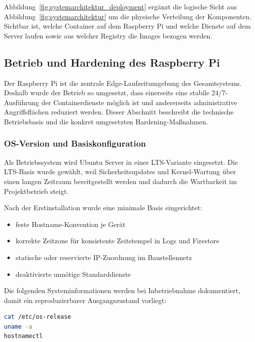 Abbildung~\ref{fig:systemarchitektur_deployment} ergänzt die logische Sicht aus Abbildung~\ref{fig:systemarchitektur} um die physische Verteilung der Komponenten. Sichtbar ist, welche Container auf dem Raspberry Pi und welche Dienste auf dem Server laufen sowie aus welcher Registry die Images bezogen werden.

\subsection{Betrieb und Hardening des Raspberry Pi}

Der Raspberry Pi ist die zentrale Edge-Laufzeitumgebung des Gesamtsystems. Deshalb wurde der Betrieb so umgesetzt, dass einerseits eine stabile 24/7-Ausführung der Containerdienste möglich ist und andererseits administrative Angriffsflächen reduziert werden. Dieser Abschnitt beschreibt die technische Betriebsbasis und die konkret umgesetzten Hardening-Maßnahmen.

\subsubsection{OS-Version und Basiskonfiguration}

Als Betriebssystem wird Ubuntu Server in einer LTS-Variante eingesetzt. Die LTS-Basis wurde gewählt, weil Sicherheitsupdates und Kernel-Wartung über einen langen Zeitraum bereitgestellt werden und dadurch die Wartbarkeit im Projektbetrieb steigt.

Nach der Erstinstallation wurde eine minimale Basis eingerichtet:

\begin{itemize}
    \item feste Hostname-Konvention je Gerät
    \item korrekte Zeitzone für konsistente Zeitstempel in Logs und Firestore
    \item statische oder reservierte IP-Zuordnung im Baustellennetz
    \item deaktivierte unnötige Standarddienste
\end{itemize}

Die folgenden Systeminformationen werden bei Inbetriebnahme dokumentiert, damit ein reproduzierbarer Ausgangszustand vorliegt:

\begin{lstlisting}[language=bash,caption={Ermittlung des OS- und Kernelstands am Raspberry Pi},label={lst:raspi_os_kernel},basicstyle=\ttfamily\small]
cat /etc/os-release
uname -a
hostnamectl
\end{lstlisting}

